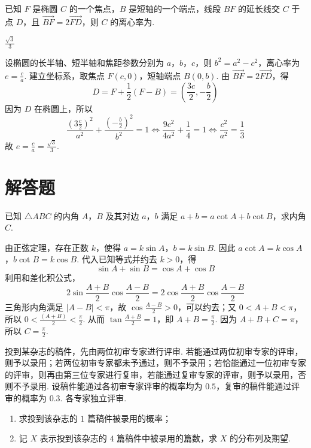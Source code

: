 \begin{problem}
已知 \(F\) 是椭圆 \(C\) 的一个焦点，\(B\) 是短轴的一个端点，线段 \(BF\) 的延长线交 \(C\) 于点 \(D\)，且 \(\overrightarrow{BF} = 2\overrightarrow{FD}\)，则 \(C\) 的离心率为\fillinblank{}.
\end{problem}

\begin{answer}
\(\frac{\sqrt{3}}{3}\)
\end{answer}

\begin{solution}
设椭圆的长半轴、短半轴和焦距参数分别为 \(a\)，\(b\)，\(c\)，则
\(b^{2}=a^{2}-c^{2}\)，离心率为 \(e=\frac{c}{a}\). 建立坐标系，取焦点
\(F(c,0)\)，短轴端点 \(B(0,b)\). 由
\(\overrightarrow{BF}=2\overrightarrow{FD}\)，得
\[
D=F+\frac12(F-B)=\left(\frac{3c}{2},-\frac b2\right)
\]
因为 \(D\) 在椭圆上，所以
\[
\frac{(3\frac{c}{2})^{2}}{a^{2}}+\frac{(-\frac{b}{2})^{2}}{b^{2}}=1
\Longleftrightarrow \frac{9c^{2}}{4a^{2}}+\frac14=1
\Longleftrightarrow \frac{c^{2}}{a^{2}}=\frac13
\]
故 \(e=\frac ca=\frac{\sqrt3}{3}\).
\end{solution}

\section{解答题}

\begin{problem}
已知 \(\triangle ABC\) 的内角 \(A\)，\(B\) 及其对边 \(a\)，\(b\) 满足 \(a + b = a \cot A + b \cot B\)，求内角 \(C\).
\end{problem}

\begin{solution}
由正弦定理，存在正数 \(k\)，使得 \(a=k\sin A\)，\(b=k\sin B\). 因此
\(a\cot A=k\cos A\)，\(b\cot B=k\cos B\). 代入已知等式并约去 \(k>0\)，得
\[
\sin A+\sin B=\cos A+\cos B
\]
利用和差化积公式，
\[
2\sin\frac{A+B}{2}\cos\frac{A-B}{2}
=2\cos\frac{A+B}{2}\cos\frac{A-B}{2}
\]
三角形内角满足 \(|A-B|<\pi\)，故 \(\cos\frac{A-B}{2}>0\)，可以约去；又
\(0<A+B<\pi\)，所以 \(0<\frac{(A+B)}{2}<\frac{\pi}{2}\). 从而
\(\tan\frac{A+B}{2}=1\)，即 \(A+B=\frac{\pi}{2}\). 因为
\(A+B+C=\pi\)，所以 \(C=\frac{\pi}{2}\).
\end{solution}

\begin{problem}
投到某杂志的稿件，先由两位初审专家进行评审. 若能通过两位初审专家的评审，则予以录用；若两位初审专家都未予通过，则不予录用；若恰能通过一位初审专家的评审，则再由第三位专家进行复审，若能通过复审专家的评审，则予以录用，否则不予录用. 设稿件能通过各初审专家评审的概率均为 \(0.5\)，复审的稿件能通过评审的概率为 \(0.3\). 各专家独立评审.
\begin{enumerate}
\item 求投到该杂志的 \(1\text{ 篇}\)稿件被录用的概率；
\item 记 \(X\) 表示投到该杂志的 \(4\text{ 篇}\)稿件中被录用的篇数，求 \(X\) 的分布列及期望.
\end{enumerate}
\end{problem}

